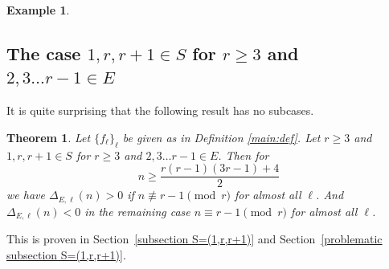 \documentclass[12pt]{amsart}
\newtheorem{theorem}{Theorem}
\theoremstyle{definition}
\newtheorem{example}{Example}
\theoremstyle{remark}
\numberwithin{theorem}{section} \numberwithin{equation}{section}
\begin{document}
\begin{example}
\begin{enumerate}

\end{enumerate}
\end{example}

\subsection{The
case $1,r,r+1 \in S$ for $r\geq 3$ and $2,3 \ldots r-1 \in E$}

It is quite surprising that the following result has no subcases.
\begin{theorem}
\label{th1rr+1}Let $\{f_{\ell}\}_{\ell}$ be given as in Definition \ref{main:def}.
Let $r \geq 3$ and $1,r,r+1 \in S$ for $r\geq 3$ and 
$2,3 \ldots r-1 \in E$. Then for
\begin{equation*}
n \geq \frac{r(r-1)(3r-1)+4}{2}
\end{equation*}
we have $\Delta _{E,\ell }\left( n\right) >
0$ if
$n \not \equiv r-1 \pmod{r}$
for almost all $\ell$.
And $\Delta _{E,\ell }\left( n\right)
< 0$ in the remaining case 
$n\equiv r-1 \pmod{r}$ for almost all $\ell$.
\end{theorem}

This is proven in Section~\ref{subsection S=(1,r,r+1)} and
Section~\ref{problematic subsection S=(1,r,r+1)}.














\end{document}
